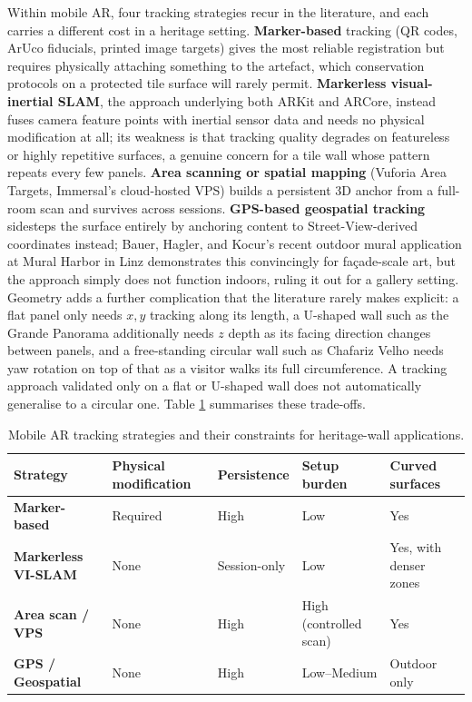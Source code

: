 Within mobile AR, four tracking strategies recur in the literature, and 
each carries a different cost in a heritage setting. \textbf{Marker-based}
tracking (QR codes, ArUco fiducials, printed image targets) gives
the most reliable registration but requires physically attaching
something to the artefact, which conservation protocols on a protected
tile surface will rarely permit. \textbf{Markerless visual-inertial SLAM}, the
approach underlying both ARKit and ARCore, instead fuses camera feature
points with inertial sensor data and needs no physical modification at
all; its weakness is that tracking quality degrades on featureless or
highly repetitive surfaces, a genuine concern for a tile wall whose
pattern repeats every few panels. \textbf{Area scanning or spatial mapping}
(Vuforia Area Targets, Immersal's cloud-hosted VPS) builds a persistent
3D anchor from a full-room scan and survives across sessions.
\textbf{GPS-based geospatial tracking} sidesteps the surface entirely by anchoring
content to Street-View-derived coordinates instead; Bauer, Hagler, and
Kocur's recent outdoor mural application at Mural Harbor in Linz
\cite{bauer2025} demonstrates this convincingly for fa\c{c}ade-scale art,
but the approach simply does not function indoors, ruling it out for a
gallery setting. Geometry adds a further complication that the
literature rarely makes explicit: a flat panel only needs $x,y$ tracking
along its length, a U-shaped wall such as the Grande Panorama
additionally needs $z$ depth as its facing direction changes between
panels, and a free-standing circular wall such as Chafariz Velho needs
yaw rotation on top of that as a visitor walks its full circumference.
A tracking approach validated only on a flat or U-shaped wall does
not automatically generalise to a circular one. Table
\ref{tab:tracking-comparison} summarises these trade-offs.

\begin{table}[h]
\centering
\caption{Mobile AR tracking strategies and their constraints for
heritage-wall applications.}
\label{tab:tracking-comparison}
\small
\begin{tabular}{p{3.4cm}p{2.0cm}p{2cm}p{2.7cm}p{2.9cm}}
\toprule
\textbf{Strategy} & \textbf{Physical modification} & \textbf{Persistence} & \textbf{Setup burden} & \textbf{Curved surfaces} \\
\midrule
\textbf{Marker-based} & Required & High & Low & Yes \\
\textbf{Markerless VI-SLAM} & None & Session-only & Low & Yes, with denser zones \\
\textbf{Area scan / VPS} & None & High & High (controlled scan) & Yes \\
\textbf{GPS / Geospatial} & None & High & Low--Medium & Outdoor only \\
\bottomrule
\end{tabular}
\end{table}

